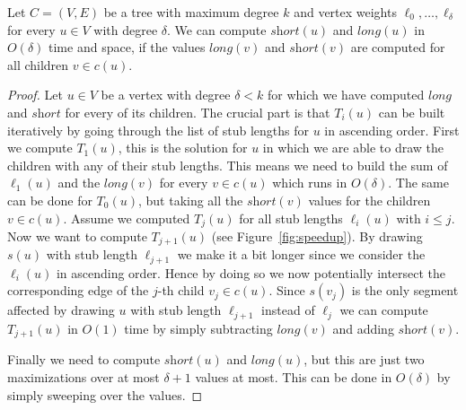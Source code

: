 \documentclass[a4paper,english,numberwithinsect]{eurocg18}
\newcommand{\sollong}{\ensuremath{\textit{long}}\xspace}
\newcommand{\solshort}{\ensuremath{\textit{short}}\xspace}
\begin{document}
\begin{lemma}
	\label{lem:compute_vertex}
	Let $ C = (V,E) $ be a tree with maximum degree $ k $ and vertex weights $ \ell_0,\dots,\ell_{\delta} $ for every $ u \in V $ with degree $ \delta $. We can compute $ \solshort(u) $ and $ \sollong(u) $ in $ O(\delta) $ time and space, if the values $ \sollong(v) $ and $ \solshort(v) $ are computed for all children $ v \in c(u) $.
\end{lemma}
\begin{proof}
	 Let $ u \in V $ be a vertex with degree $ \delta < k $ for which we have computed $ \sollong $ and $ \solshort $ for every of its children. The crucial part is that $ T_i(u) $ can be built iteratively by going through the list of stub lengths for $ u $ in ascending order. First we compute $ T_1(u) $, this is the solution for $ u $ in which we are able to draw the children with any of their stub lengths. This means we need to build the sum of $ \ell_1(u) $ and the $ \sollong(v) $ for every $ v \in c(u) $ which runs in $ O(\delta) $. The same can be done for $ T_0(u) $, but taking all the $ \solshort(v) $ values for the children $ v \in c(u) $. Assume we computed $ T_j(u) $ for all stub lengths $ \ell_i(u) $ with $ i \leq j $. Now we want to compute $ T_{j+1}(u) $ (see Figure~\ref{fig:speedup}). By drawing $ s(u) $ with stub length $ \ell_{j +1} $ we make it a bit longer since we consider the $ \ell_i(u) $ in ascending order. Hence by doing so we now potentially intersect the corresponding edge of the $ j $-th child $ v_j \in c(u) $. Since $ s(v_j) $ is the only segment affected by drawing $ u $ with stub length $ \ell_{j + 1} $ instead of $ \ell_j $ we can compute $ T_{j+1}(u) $ in $O(1)$ time by simply subtracting $ \sollong(v) $ and adding $ \solshort(v) $.
	
	Finally we need to compute $ \solshort(u) $ and $ \sollong(u) $, but this are just two maximizations over at most $ \delta + 1 $ values at most. This can be done in $ O(\delta) $ by simply sweeping over the values.
\end{proof}
\end{document}

